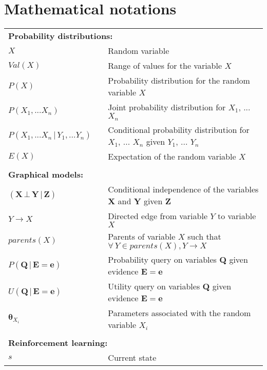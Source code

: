 
\chapter*{Mathematical notations}
\thispagestyle{empty}

\begin{longtable}{lp{5mm}p{11cm}}
\multicolumn{3}{l}{\textbf{Probability distributions:}} \vspace{2mm} \\
$X$ && Random variable \\
$Val(X)$ && Range of values for the variable $X$ \\
$P(X)$ && Probability distribution for the random variable $X$ \\
$P(X_1, ...X_n)$ && Joint probability distribution for $X_1$, ... $X_n$ \\
$P(X_1,...X_n \, | \, Y_1, ... Y_n)$ && Conditional probability distribution for $X_1$, ... $X_n$ given $Y_1$, ... $Y_n$  \\ 
$E(X)$ && Expectation of the random variable $X$ \\
&&  \vspace{0mm} \\
\multicolumn{3}{l}{\textbf{Graphical models:}} \vspace{2mm} \\
$(\mathbf{X} \, \bot \, \mathbf{Y} \, | \, \mathbf{Z})$ && Conditional independence of the variables $\mathbf{X} $ and $\mathbf{Y}$ given $\mathbf{Z}$ \\
$Y \rightarrow X$ && Directed edge from variable $Y$ to variable $X$ \\
$parents(X)$ && Parents of variable $X$ such that $\forall\, Y\!\in\!parents(X), Y \rightarrow X$ \\
 $P(\mathbf{Q}  \, | \,  \mathbf{E}\!=\!\mathbf{e})$ && Probability query on variables $\mathbf{Q}$ given evidence $\mathbf{E}\!=\!\mathbf{e}$ \\ 
 $U(\mathbf{Q}  \, | \,  \mathbf{E}\!=\!\mathbf{e})$ && Utility query on variables $\mathbf{Q}$ given evidence $\mathbf{E}\!=\!\mathbf{e}$ \\ 
 $\boldsymbol\theta_{X_i}$ && Parameters associated with the random variable $X_i$ \\ 
 &&  \vspace{0mm} \\
\multicolumn{3}{l}{\textbf{Reinforcement learning:}} \vspace{2mm} \\
$s$ && Current state \\

\end{longtable}
